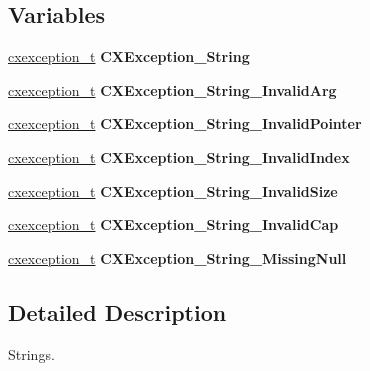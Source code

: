 \subsection*{Variables}
\begin{DoxyCompactItemize}
\item 
\mbox{\label{a00026_a643caff68e8ac61182eb782b4e8ffe19}} 
\hyperlink{a00048}{cxexception\+\_\+t} {\bfseries C\+X\+Exception\+\_\+\+String}
\item 
\mbox{\label{a00026_af8b0da91153c365a6ea0521c60809d24}} 
\hyperlink{a00048}{cxexception\+\_\+t} {\bfseries C\+X\+Exception\+\_\+\+String\+\_\+\+Invalid\+Arg}
\item 
\mbox{\label{a00026_a5a62e9abf565e296eaca7d996f9fdd0f}} 
\hyperlink{a00048}{cxexception\+\_\+t} {\bfseries C\+X\+Exception\+\_\+\+String\+\_\+\+Invalid\+Pointer}
\item 
\mbox{\label{a00026_afd5773832287930848fd2d9c6a4b0861}} 
\hyperlink{a00048}{cxexception\+\_\+t} {\bfseries C\+X\+Exception\+\_\+\+String\+\_\+\+Invalid\+Index}
\item 
\mbox{\label{a00026_a177f51ddbf4e14a2a601c1184e8375d7}} 
\hyperlink{a00048}{cxexception\+\_\+t} {\bfseries C\+X\+Exception\+\_\+\+String\+\_\+\+Invalid\+Size}
\item 
\mbox{\label{a00026_abdc7440bf9edc0d809a27902856bd312}} 
\hyperlink{a00048}{cxexception\+\_\+t} {\bfseries C\+X\+Exception\+\_\+\+String\+\_\+\+Invalid\+Cap}
\item 
\mbox{\label{a00026_aa2c7dd02559c16c8e5c74416dbb6d1ac}} 
\hyperlink{a00048}{cxexception\+\_\+t} {\bfseries C\+X\+Exception\+\_\+\+String\+\_\+\+Missing\+Null}
\end{DoxyCompactItemize}


\subsection{Detailed Description}
Strings. 

